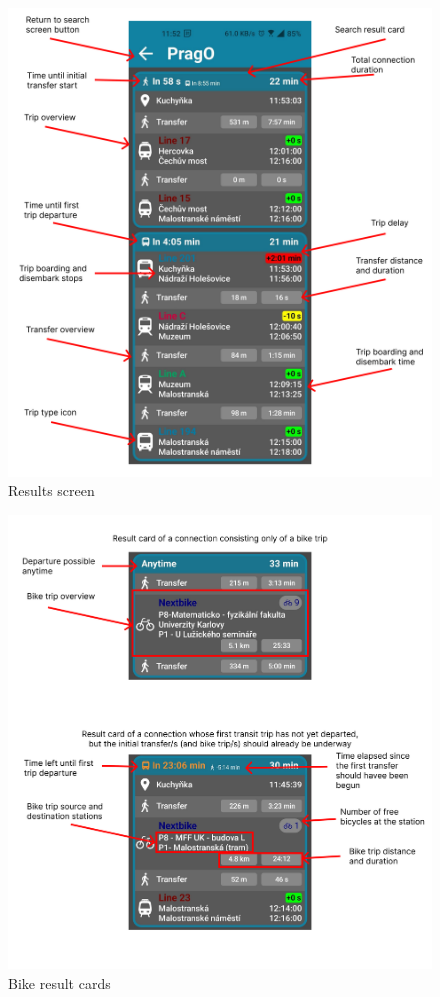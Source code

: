 \begin{figure}[h!]
    \centering
    \includegraphics[width=\textwidth]{img/ui_descriptions/result_screen.pdf}
    \caption{Results screen}
    \label{fig:results_screen}
\end{figure}

\begin{figure}[h!]
    \centering
    \includegraphics[width=\textwidth]{img/ui_descriptions/bike_results.pdf}
    \caption{Bike result cards}
    \label{fig:bike_results}
\end{figure}


